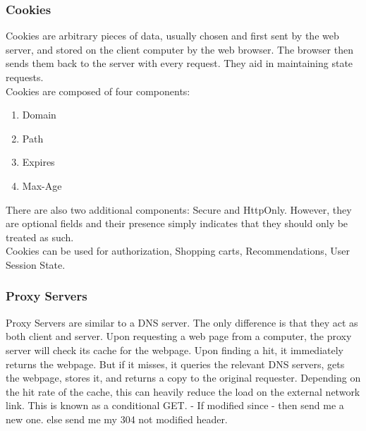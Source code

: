 \documentclass{article}
\begin{document}
\subsubsection{Cookies}
Cookies are arbitrary pieces of data, usually chosen and first sent by the web server, and stored on the client computer by the web browser. The browser then sends them back to the server with every request. They aid in maintaining state requests.\\
Cookies are composed of four components:\\
\begin{enumerate}
    \item Domain
    \item Path
    \item Expires
    \item Max-Age
\end{enumerate}
There are also two additional components: Secure and HttpOnly. However, they are optional fields and their presence simply indicates that they should only be treated as such.\\
Cookies can be used for authorization, Shopping carts, Recommendations, User Session State.
\subsubsection{Proxy Servers}
Proxy Servers are similar to a DNS server. The only difference is that they act as both client and server. Upon requesting a web page from a computer, the proxy server will check its cache for the webpage. Upon finding a hit, it immediately returns the webpage. But if it misses, it queries the relevant DNS servers, gets the webpage, stores it, and returns a copy to the original requester. Depending on the hit rate of the cache, this can heavily reduce the load on the external network link. This is known as a conditional GET. - If modified since - then send me a new one. else send me my 304 not modified header.
\end{document}
